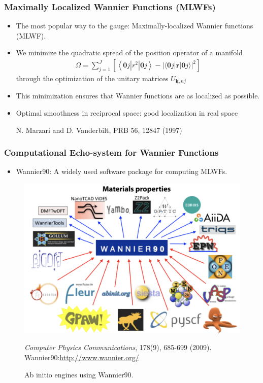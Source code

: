 \documentclass{CustomBeamer}
\begin{document}
    \begin{frame}
    \frametitle{Maximally Localized Wannier Functions (MLWFs)}
    \begin{itemize}
        \item The most popular way to the gauge: Maximally-localized Wannier functions (MLWF).
        \item We minimize the quadratic spread of the position operator of a manifold
        \begin{align}
        \Omega=\sum_{j=1}^J\left[\left\langle\mathbf{0} j\left|r^2\right| \mathbf{0} j\right\rangle-|\langle\mathbf{0} j|\mathbf{r}| \mathbf{0} j\rangle|^2\right]
        \end{align}
        through the optimization of the unitary matrices $U_{\mathbf{k}, n j}$
        \item This minimization ensures that Wannier functions are as localized as possible.
        \item Optimal smoothness in reciprocal space: good localization in real space

        N. Marzari and D. Vanderbilt, PRB 56, 12847 (1997)
    \end{itemize}
    \end{frame}
    
    \begin{frame}
    \frametitle{Computational Echo-system for Wannier Functions}
    \begin{itemize}
        \item Wannier90: A widely used software package for computing MLWFs.
    \end{itemize}
    \begin{figure}
        \centering
        \includegraphics[width=0.5\linewidth]{wannier90.png}
        \caption{Ab initio engines using Wannier90. }
        \item \textit{Computer Physics Communications}, 178(9), 685-699 (2009). Wannier90:\url{http://www.wannier.org/}
    \end{figure}
    \end{frame}
    
\end{document}
